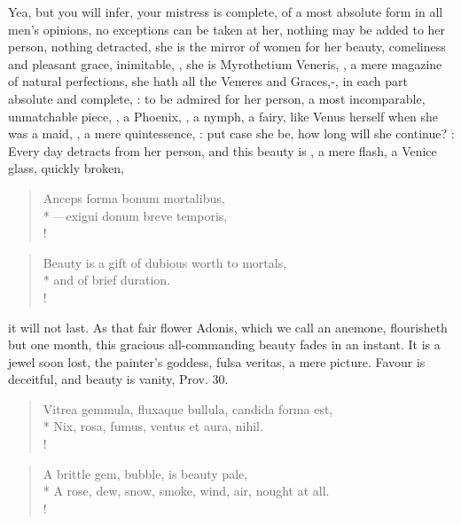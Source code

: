 Yea, but you will infer, your mistress is complete, of a most absolute
form in all men's opinions, no exceptions can be taken at her, nothing
may be added to her person, nothing detracted, she is the mirror of
women for her beauty, comeliness and pleasant grace, inimitable, , she is Myrothetium Veneris, , a
mere magazine of natural perfections, she hath all the Veneres and
Graces,-, in each part absolute and
complete, : to be admired for her
person, a most incomparable, unmatchable piece, , a Phoenix, , a nymph, a fairy, like Venus herself when she
was a maid, , a mere quintessence, : put case she be, how long will she continue?
: Every day
detracts from her person, and this beauty is , a mere flash,
a Venice glass, quickly broken,
\begin{latin}%
\begin{verse}%
Anceps forma bonum mortalibus,\\*
---exigui donum breve temporis,\\!
\end{verse}%
\end{latin}%
\translationrule%
\begin{verse}%
Beauty is a gift of dubious worth to mortals,\\*
and of brief duration.\\!
\end{verse}%
%

it will not last. As that fair flower Adonis, which we call an
anemone, flourisheth but one month, this gracious all-commanding beauty
fades in an instant. It is a jewel soon lost, the painter's goddess,
fulsa veritas, a mere picture. Favour is deceitful, and beauty is
vanity, Prov.  30.
%
\begin{latin}%
\begin{verse}%
Vitrea gemmula, fluxaque bullula, candida forma est,\\*
Nix, rosa, fumus, ventus et aura, nihil.\\!
\end{verse}%
\end{latin}%
\translationrule%
\begin{verse}%
A brittle gem, bubble, is beauty pale,\\*
A rose, dew, snow, smoke, wind, air, nought at all.\\!
\end{verse}%
%

